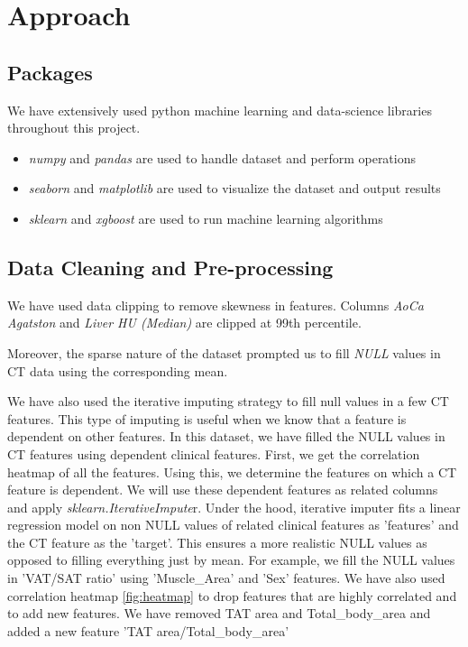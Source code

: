 \section{Approach}


\subsection{Packages}
We have extensively used python machine learning and data-science libraries throughout this project.

\begin{itemize}
    \item \textit{numpy} and \textit{pandas} are used to handle dataset and perform operations
    \item \textit{seaborn} and \textit{matplotlib} are used to visualize the dataset and output results
    \item \textit{sklearn} and \textit{xgboost} are used to run machine learning algorithms
\end{itemize}

\subsection{Data Cleaning and Pre-processing}

We have used data clipping to remove skewness in features. Columns \textit{AoCa Agatston} and \textit{Liver HU (Median)} are clipped at 99th percentile.

Moreover, the sparse nature of the dataset prompted us to fill \textit{NULL} values in CT data using the corresponding mean.

We have also used the iterative imputing strategy \cite{imputing} to fill null values in a few CT features. This type of imputing is useful when we know that a feature is dependent on other features. In this dataset, we have filled the NULL values in CT features using dependent clinical features. First, we get the correlation heatmap of all the features. Using this, we determine the features on which a CT feature is dependent. We will use these dependent features as related columns and apply \textit{sklearn.IterativeImpute}r. Under the hood, iterative imputer fits a linear regression model on non NULL values of related clinical features as 'features' and the CT feature as the 'target'. This ensures a more realistic NULL values as opposed to filling everything just by mean.
For example, we fill the NULL values in 'VAT/SAT ratio' using 'Muscle\_Area' and 'Sex' features.
We have also used correlation heatmap \ref{fig:heatmap} to drop features that are highly correlated and to add new features. We have removed TAT area and Total\_body\_area and added a new feature 'TAT area/Total\_body\_area'

